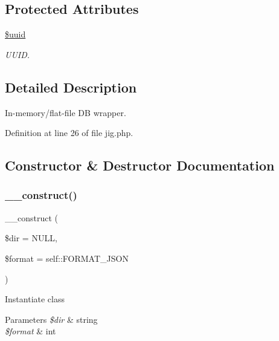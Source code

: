 \subsection*{Protected Attributes}
\begin{DoxyCompactItemize}
\item 
\hypertarget{class_d_b_1_1_jig_aeccc2a337445686487ea085278c79eff}{}\label{class_d_b_1_1_jig_aeccc2a337445686487ea085278c79eff} 
\hyperlink{class_d_b_1_1_jig_aeccc2a337445686487ea085278c79eff}{\$uuid}
\begin{DoxyCompactList}\small\item\em U\+U\+ID. \end{DoxyCompactList}\end{DoxyCompactItemize}


\subsection{Detailed Description}
In-\/memory/flat-\/file DB wrapper. 

Definition at line 26 of file jig.\+php.



\subsection{Constructor \& Destructor Documentation}
\hypertarget{class_d_b_1_1_jig_a2a82bc563fc5e6152b0d0eb2c687b10a}{}\label{class_d_b_1_1_jig_a2a82bc563fc5e6152b0d0eb2c687b10a} 
\subsubsection{\texorpdfstring{\+\_\+\+\_\+construct()}{\_\_construct()}}
{\footnotesize\ttfamily \+\_\+\+\_\+construct (\begin{DoxyParamCaption}\item[{}]{\$dir = {\ttfamily NULL},  }\item[{}]{\$format = {\ttfamily self\+:\+:FORMAT\+\_\+JSON} }\end{DoxyParamCaption})}

Instantiate class 
\begin{DoxyParams}{Parameters}
{\em \$dir} & string \\
\hline
{\em \$format} & int \\
\hline
\end{DoxyParams}


